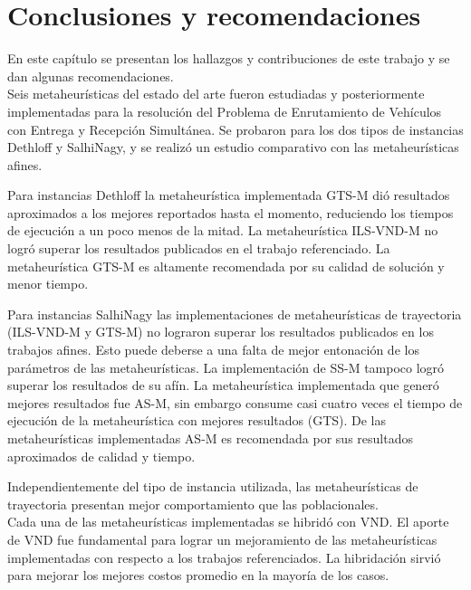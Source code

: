 \chapter*{Conclusiones y recomendaciones} \label{chap:conclusiones}

En este capítulo se presentan los hallazgos y contribuciones de este trabajo y se dan algunas recomendaciones.\\

Seis metaheurísticas del estado del arte fueron estudiadas y posteriormente implementadas para la resolución del Problema de Enrutamiento de Vehículos con Entrega y Recepción Simultánea. 
Se probaron para los dos tipos de instancias Dethloff y SalhiNagy, y se realizó un estudio comparativo con las metaheurísticas afines.

Para instancias Dethloff la metaheurística implementada GTS-M dió resultados aproximados a los mejores re\-por\-ta\-dos hasta el momento, reduciendo los tiempos de ejecución a un poco menos de la mitad. La metaheurística ILS-VND-M no logró superar los resultados publicados en el trabajo referenciado. La metaheurística GTS-M es altamente recomendada por su calidad de solución y menor tiempo.

Para instancias SalhiNagy las implementaciones de metaheurísticas de trayectoria (ILS-VND-M y GTS-M)  no lograron superar los resultados publicados en los trabajos afines. Esto puede deberse a una falta de mejor entonación de los parámetros de las metaheurísticas. La implementación de SS-M tampoco logró superar los resultados de su afín. La metaheurística implementada que generó mejores resultados fue AS-M, sin embargo consume casi cuatro veces el tiempo de ejecución de la metaheurística con mejores resultados (GTS). De las metaheurísticas implementadas AS-M es recomendada por sus resultados a\-proxi\-ma\-dos de calidad y tiempo.

Independientemente del tipo de instancia utilizada, las metaheurísticas de trayectoria presentan mejor comportamiento que las poblacionales.\\

Cada una de las metaheurísticas implementadas se hibridó con VND. El aporte de VND fue fundamental para lograr un mejoramiento de las metaheurísticas implementadas con respecto a los trabajos referenciados. La hibridación sirvió para mejorar los mejores costos promedio en la mayoría de los casos.\\

